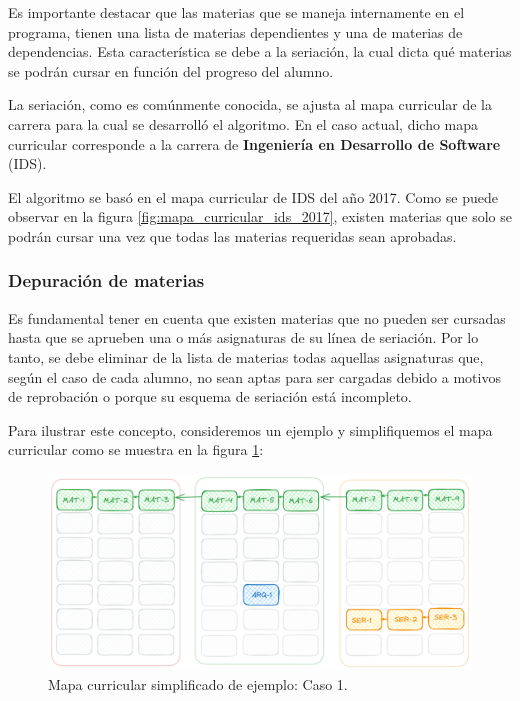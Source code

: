 Es importante destacar que las materias que se maneja internamente en el programa, tienen una lista de materias dependientes y una de materias de dependencias. Esta característica se debe a la seriación, la cual dicta qué materias se podrán cursar en función del progreso del alumno. %

La seriación, como es comúnmente conocida, se ajusta al mapa curricular de la carrera para la cual se desarrolló el algoritmo. En el caso actual, dicho mapa curricular corresponde a la carrera de \textbf{Ingeniería en Desarrollo de Software} (IDS). %

El algoritmo se basó en el mapa curricular de IDS del año 2017. Como se puede observar en la figura \ref{fig:mapa_curricular_ids_2017}, existen materias que solo se podrán cursar una vez que todas las materias requeridas sean aprobadas. %


\subsubsection{Depuración de materias} \label{depuracion_de_materias}
Es fundamental tener en cuenta que existen materias que no pueden ser cursadas hasta que se aprueben una o más asignaturas de su línea de seriación. Por lo tanto, se debe eliminar de la lista de materias todas aquellas asignaturas que, según el caso de cada alumno, no sean aptas para ser cargadas debido a motivos de reprobación o porque su esquema de seriación está incompleto. %

Para ilustrar este concepto, consideremos un ejemplo y simplifiquemos el mapa curricular como se muestra en la figura \ref{fig:mapa_curricular_simplificado_caso_1}: %

\begin{figure}[h]
    \centering
    \includegraphics[width=\textwidth]{images/AG-Simple-Serial-Squeme.png}
    \caption{Mapa curricular simplificado de ejemplo: Caso 1.}
    \label{fig:mapa_curricular_simplificado_caso_1}
\end{figure}

